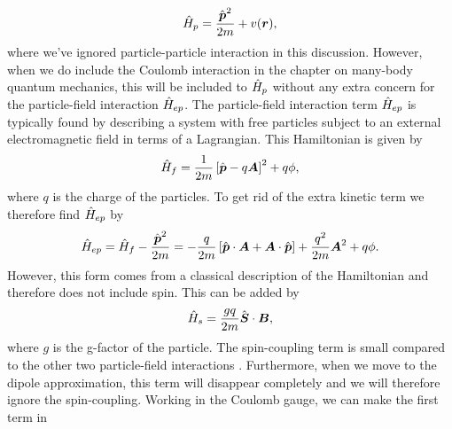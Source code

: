             \begin{align}
                \hat{H}_{p}
                = \frac{\hat{\boldsymbol{p}}^2}{2m}
                + v(\boldsymbol{r}),
            \end{align}
            where we've ignored particle-particle interaction in this
            discussion.
            However, when we do include the Coulomb interaction in the chapter
            on many-body quantum mechanics, this will be included to $\hat{H}_p$
            without any extra concern for the particle-field interaction
            $\hat{H}_{ep}$.
            The particle-field interaction term $\hat{H}_{ep}$ is typically found
            by describing a system with free particles subject to an external
            electromagnetic field in terms of a Lagrangian.
            This Hamiltonian is given by
            \begin{align}
                \hat{H}_{f}
                = \frac{1}{2m}\left[ 
                    \hat{\boldsymbol{p}}
                    - q\boldsymbol{A}
                 \right]^2
                + q\phi,
            \end{align}
            where $q$ is the charge of the particles.
            To get rid of the extra kinetic term we therefore find $\hat{H}_{ep}$
            by
            \begin{align}
                \hat{H}_{ep}
                = \hat{H}_{f}
                - \frac{\hat{\boldsymbol{p}}^2}{2m}
                =
                -\frac{q}{2m}\left[ 
                    \hat{\boldsymbol{p}}\cdot \boldsymbol{A}
                    + \boldsymbol{A}\cdot\hat{\boldsymbol{p}}
                 \right]
                + \frac{q^2}{2m}
                \boldsymbol{A}^2
                + q\phi.
                \label{eq:hamil-ep-pre}
            \end{align}
            However, this form comes from a classical description of the
            Hamiltonian and therefore does not include spin.
            This can be added by
            \begin{align}
                \hat{H}_s
                = \frac{g q}{2m}\hat{\boldsymbol{S}}\cdot\boldsymbol{B},
                \label{eq:hamil-s}
            \end{align}
            where $g$ is the g-factor of the particle.
            The spin-coupling term is small compared to the other two
            particle-field interactions \cite{modern-qm}.
            Furthermore, when we move to the dipole approximation, this term
            will disappear completely and we will therefore ignore the
            spin-coupling.
            Working in the Coulomb gauge, we can make the first term in
